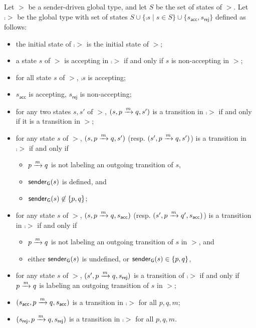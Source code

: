 \begin{definition}\label{def:complement-of-a-sender-driven-gt}
    Let $\gt$ be a sender-driven global type, and let $S$ be the set of states of $\gt$.
    Let $\comp{\gt}$ be the global type with set of states $S\cup\{\comp{s}\mid s\in S\}\cup\{s_{\mathsf{acc}},s_{\mathsf{rej}}\}$
    defined as follows:
    \begin{itemize}
        \item the initial state of $\comp{\gt}$ is the initial state of $\gt$;
        \item a state $s$ of $\gt$ is accepting in $\comp{\gt}$ if and only if 
        $s$ is non-accepting in $\gt$;
        \item for all state $s$ of $\gt$, $\comp{s}$ is accepting;
        \item $s_{\mathsf{acc}}$ is accepting, $s_{\mathsf{rej}}$ is non-accepting;
        \item for any two states $s,s'$ of $\gt$, $(s,\gtlabel{p}{q}{m},s')$ is a transition in $\comp{\gt}$ if and only if
        it is a transition in $\gt$;
        \item for any state $s$ of $\gt$, $(s,\gtlabel{p}{q}{m},\comp{s})$ (resp. $(\comp{s},\gtlabel{p}{q}{m},\comp{s})$) 
        is a transition in $\comp{\gt}$
        if and only if 
        \begin{itemize}
            \item $\gtlabel{p}{q}{m}$ is not labeling an outgoing transition of $s$,  
            \item $\senderof{\gt}{s}$ is defined, and
            \item $\senderof{\gt}{s}\not\in\{p,q\}$;
        \end{itemize}
        \item for any state $s$ of $\gt$, $(s,\gtlabel{p}{q}{m},s_{\mathsf{acc}})$  (resp. $(\comp{s},\gtlabel{p}{q'}{m},s_{\mathsf{acc}})$)
        is a transition in $\comp{\gt}$ 
        if and only if 
        \begin{itemize}
            \item $\gtlabel{p}{q}{m}$ is not labeling an outgoing transition of $s$ in $\gt$, and
            \item either $\senderof{\gt}{s}$ is undefined, or $\senderof{\gt}{s}\in\{p,q\}$,
        \end{itemize}
        \item for any state $s$ of $\gt$, $(\comp{s},\gtlabel{p}{q}{m},s_{\mathsf{rej}})$
        is a transition of $\comp{\gt}$ if and only if $\gtlabel{p}{q}{m}$ is labeling an outgoing transition of $s$ in $\gt$;
        \item $(s_{\mathsf{acc}},\gtlabel{p}{q}{m},s_{\mathsf{acc}})$ is a transition in $\comp{\gt}$ for all $p,q,m$;
        \item $(s_{\mathsf{rej}},\gtlabel{p}{q}{m},s_{\mathsf{rej}})$ is a transition in $\comp{\gt}$ for all $p,q,m$.
    \end{itemize}
\end{definition}


